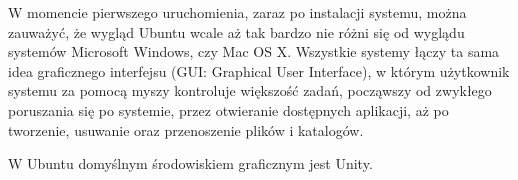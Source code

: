 
W momencie pierwszego uruchomienia, zaraz po instalacji systemu, można zauważyć, że wygląd Ubuntu wcale aż tak bardzo nie różni się od wyglądu systemów Microsoft Windows, czy Mac OS X. Wszystkie systemy łączy ta sama idea graficznego interfejsu (\textcolor{ubuntu_orange}{GUI: Graphical User Interface}), w którym użytkownik systemu za pomocą myszy kontroluje większość zadań, począwszy od zwykłego poruszania się po systemie, przez otwieranie dostępnych aplikacji, aż po tworzenie, usuwanie oraz przenoszenie plików i katalogów.

W Ubuntu domyślnym środowiskiem graficznym jest Unity.
